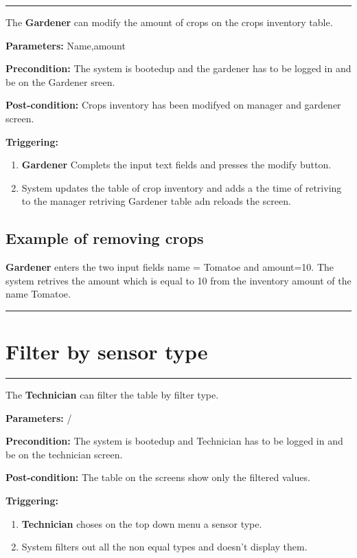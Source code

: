 \hrule
\hfill
\vspace{0.5cm}
\label{operation:modifyCropsAmount}
The \textbf{Gardener} can modify the amount of crops on the crops inventory
table.
\begin{description}
\item \textbf{Parameters:} Name,amount
\item \textbf{Precondition:} The system is bootedup and the gardener has to be
logged in and be on the Gardener sreen.
\item \textbf{Post-condition:} Crops inventory has been modifyed on manager and
gardener screen.

\item \textbf{Triggering:}
\begin{enumerate}
\item \textbf{Gardener} Complets the input text fields and presses the modify
button.
\item System updates the table of crop inventory and adds a the time of
retriving to the manager retriving Gardener table adn reloads the screen.
\end{enumerate}
\end{description}

\subsection{Example of removing crops}
\textbf{Gardener} enters the two input fields name = Tomatoe and amount=10.
The system retrives the amount which is equal to 10 from the inventory amount of
the name Tomatoe.
\hfill
\vspace{0.5cm}
\hrule

\break

\section{Filter by sensor type}

\hrule
\hfill
\vspace{0.5cm}

\label{operation:filterSensorTable}

The \textbf{Technician} can filter the table by filter type.
\begin{description}

\item \textbf{Parameters:} /
\item \textbf{Precondition:} The system is bootedup and Technician has to be
logged in and be on the technician screen.
\item \textbf{Post-condition:} The table on the screens show only the filtered
values.

\item \textbf{Triggering:}
\begin{enumerate}
\item \textbf{Technician} choses on the top down menu a sensor type.
\item System filters out all the non equal types and doesn't display them.
\end{enumerate}
\end{description}

